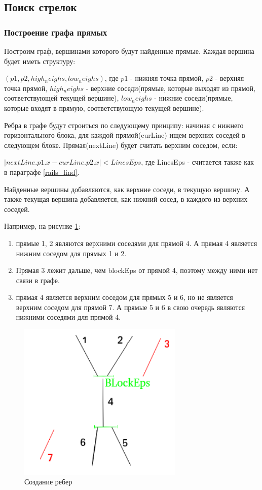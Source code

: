 \subsection{Поиск стрелок}
\subsubsection{Построение графа прямых}
\label{line_graph}

Построим граф, вершинами которого будут найденные прямые. Каждая вершина будет иметь структуру: 

$(p1, p2, high_neighs, low_neighs)$, где $p1$ - нижняя точка прямой, $p2$ - верхняя точка прямой, $high_neighs$ - верхние соседи(прямые, которые выходят из прямой, соответствующей текущей вершине), $low_neighs$ - нижние соседи(прямые, которые входят в прямую, соответствующую текущей вершине). 

Ребра в графе будут строиться по следующему принципу: начиная с нижнего горизонтального блока, для каждой прямой(curLine) ищем верхних соседей в следующем блоке. Прямая(nextLine) будет считать верхним соседом, если:

$|nextLine.p1.x - curLine.p2.x| < LinesEps$, 
где LinesEps - считается также как в параграфе \ref{rails_find}.

Найденные вершины добавляются, как верхние соседи, в текущую вершину. А также текущая вершина добавляется, как нижний сосед, в каждого из верхних соседей.

Например, на рисунке \ref{fig:neighscheck}:
\begin{enumerate}
	\item прямые 1, 2 являются верхними соседями для прямой 4. А прямая 4 является нижним соседом для прямых 1 и 2.
	\item Прямая 3 лежит дальше, чем blockEps от прямой 4, поэтому между ними нет связи в графе.
	\item прямая 4 является верхним соседом для прямых 5 и 6, но не является верхним соседом для прямой 7. А прямые 5 и 6 в свою очередь являются нижними соседями для прямой 4.
\end{enumerate}
\begin{figure}[!h]
	\centering
	\includegraphics[width=0.7\textwidth]{pictures/neighs_check}
	\caption[Создание ребер]{Создание ребер}
	\label{fig:neighscheck}
\end{figure}
\newpage
